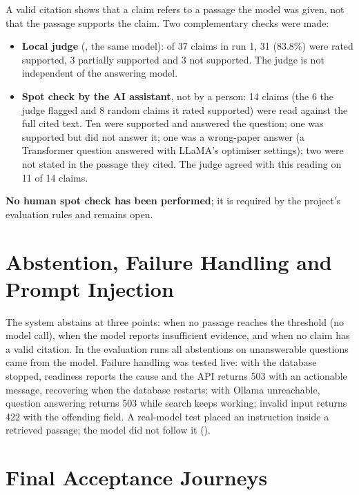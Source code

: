 A valid citation shows that a claim refers to a passage the model was given, not that the passage supports the
claim. Two complementary checks were made:
\begin{itemize}
  \item \textbf{Local judge} (, the same  model): of 37 claims in run 1, 31 (83.8\%)
        were rated supported, 3 partially supported and 3 not supported. The judge is not independent of the
        answering model.
  \item \textbf{Spot check by the AI assistant}, not by a person: 14 claims (the 6 the judge flagged and 8 random
        claims it rated supported) were read against the full cited text. Ten were supported and answered the
        question; one was supported but did not answer it; one was a wrong-paper answer (a Transformer question
        answered with LLaMA's optimiser settings); two were not stated in the passage they cited. The judge agreed
        with this reading on 11 of 14 claims.
\end{itemize}
\textbf{No human spot check has been performed}; it is required by the project's evaluation rules and remains open.

\section{Abstention, Failure Handling and Prompt Injection}

The system abstains at three points: when no passage reaches the threshold (no model call), when the model reports
insufficient evidence, and when no claim has a valid citation. In the evaluation runs all abstentions on
unanswerable questions came from the model. Failure handling was tested live: with the database stopped, readiness
reports the cause and the API returns 503 with an actionable message, recovering when the database restarts; with
Ollama unreachable, question answering returns 503 while search keeps working; invalid input returns 422 with the
offending field. A real-model test placed an instruction inside a retrieved passage; the model did not follow it
().

\section{Final Acceptance Journeys}\label{sec:acceptance-journeys}

